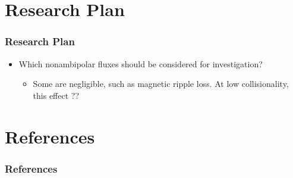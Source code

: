 \documentclass{beamer}
\begin{document}
\section{Research Plan}
\begin{frame}
\frametitle{Research Plan}
\begin{itemize}
	\item Which nonambipolar fluxes should be considered for investigation?
	\begin{itemize}
		\item Some are negligible, such as magnetic ripple loss. At low collisionality, this effect ??
	\end{itemize}
\end{itemize}
\end{frame}


\section{References}
\begin{frame}
\frametitle{References}
\renewcommand*{\bibfont}{\tiny}
\printbibliography
\end{frame}
\end{document}
